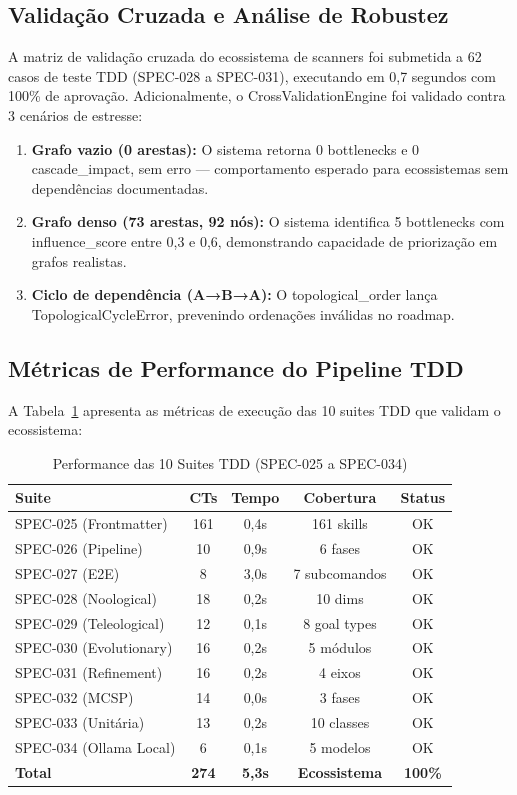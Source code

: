 \subsection{Validação Cruzada e Análise de Robustez}

A matriz de validação cruzada do ecossistema de scanners foi submetida a 62 casos de teste TDD (SPEC-028 a SPEC-031), executando em 0,7 segundos com 100\% de aprovação. Adicionalmente, o CrossValidationEngine foi validado contra 3 cenários de estresse:

\begin{enumerate}
  \item \textbf{Grafo vazio (0 arestas):} O sistema retorna 0 bottlenecks e 0 cascade\_impact, sem erro --- comportamento esperado para ecossistemas sem dependências documentadas.
  \item \textbf{Grafo denso (73 arestas, 92 nós):} O sistema identifica 5 bottlenecks com influence\_score entre 0,3 e 0,6, demonstrando capacidade de priorização em grafos realistas.
  \item \textbf{Ciclo de dependência (A→B→A):} O topological\_order lança TopologicalCycleError, prevenindo ordenações inválidas no roadmap.
\end{enumerate}

\subsection{Métricas de Performance do Pipeline TDD}

A Tabela~\ref{tab:tdd-performance} apresenta as métricas de execução das 10 suites TDD que validam o ecossistema:

\begin{table}[H]
\centering
\caption{Performance das 10 Suites TDD (SPEC-025 a SPEC-034)}
\label{tab:tdd-performance}
\begin{tabular}{p{2.5cm}cccc}
\toprule
\textbf{Suite} & \textbf{CTs} & \textbf{Tempo} & \textbf{Cobertura} & \textbf{Status} \\
\midrule
SPEC-025 (Frontmatter) & 161 & 0,4s & 161 skills & OK \\
SPEC-026 (Pipeline) & 10 & 0,9s & 6 fases & OK \\
SPEC-027 (E2E) & 8 & 3,0s & 7 subcomandos & OK \\
SPEC-028 (Noological) & 18 & 0,2s & 10 dims & OK \\
SPEC-029 (Teleological) & 12 & 0,1s & 8 goal types & OK \\
SPEC-030 (Evolutionary) & 16 & 0,2s & 5 módulos & OK \\
SPEC-031 (Refinement) & 16 & 0,2s & 4 eixos & OK \\
SPEC-032 (MCSP) & 14 & 0,0s & 3 fases & OK \\
SPEC-033 (Unitária) & 13 & 0,2s & 10 classes & OK \\
SPEC-034 (Ollama Local) & 6 & 0,1s & 5 modelos & OK \\
\addlinespace
\textbf{Total} & \textbf{274} & \textbf{5,3s} & \textbf{Ecossistema} & \textbf{100\%} \\
\bottomrule
\end{tabular}
\end{table}


